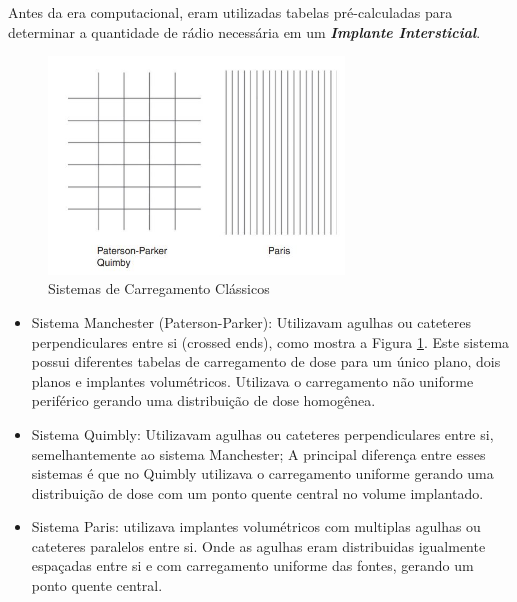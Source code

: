 \documentclass[11pt,a4paper]{article}
\begin{document}
			Antes da era computacional, eram utilizadas tabelas pré-calculadas para determinar a quantidade de rádio necessária em um \textit{\textbf{\textcolor{CarnationPink}{Implante Intersticial}}}.

			\begin{figure}[h]
				\centering
				\includegraphics[width=0.7\textwidth]{Imagens/carregamentosHistoricos.JPG}
				\caption{Sistemas de Carregamento Clássicos}
				\label{img:carregamentosHistoricos}
			\end{figure}


			\begin{itemize}
				\item Sistema Manchester (Paterson-Parker): Utilizavam agulhas ou cateteres perpendiculares entre si (crossed ends), como mostra a Figura \ref{img:carregamentosHistoricos}.  Este sistema possui diferentes tabelas de carregamento de dose para um único plano, dois planos e implantes volumétricos. Utilizava o carregamento não uniforme periférico gerando uma distribuição de dose homogênea.
				
				\item Sistema Quimbly: Utilizavam agulhas ou cateteres perpendiculares entre si, semelhantemente ao sistema Manchester; A principal diferença entre esses sistemas é que no Quimbly utilizava o carregamento uniforme gerando uma distribuição de dose com um ponto quente central no volume implantado. 
				
				\item Sistema Paris: utilizava implantes volumétricos com multiplas agulhas ou cateteres paralelos entre si. Onde as agulhas eram distribuidas igualmente espaçadas entre si e com carregamento uniforme das fontes, gerando um ponto quente central. 
			\end{itemize}

\end{document}
